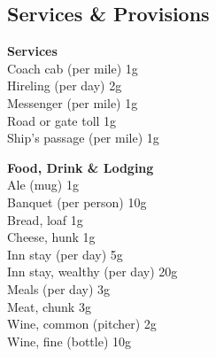 \documentclass[10pt,twoside]{article}
\begin{document}
\subsection{Services \& Provisions}

\begin{multicols}{2}
\textbf{Services} \\
Coach cab (per mile) \dotfill 1g \\
Hireling (per day) \dotfill 2g \\
Messenger (per mile) \dotfill 1g \\
Road or gate toll \dotfill 1g \\
Ship's passage (per mile) \dotfill 1g \\

\columnbreak

\textbf{Food, Drink \& Lodging} \\
Ale (mug) \dotfill 1g \\
Banquet (per person) \dotfill 10g \\
Bread, loaf \dotfill 1g \\
Cheese, hunk \dotfill 1g \\
Inn stay (per day) \dotfill 5g \\
Inn stay, wealthy (per day) \dotfill 20g \\
Meals (per day) \dotfill 3g \\
Meat, chunk \dotfill 3g \\
Wine, common (pitcher) \dotfill 2g \\
Wine, fine (bottle) \dotfill 10g \\
\end{multicols}
\end{document}
